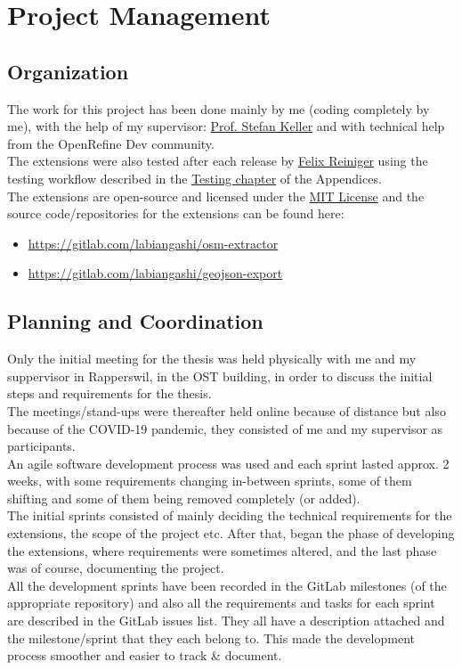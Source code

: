 \chapter{Project Management}
\section{Organization}
The work for this project has been done mainly by me (coding completely by me), with the help of my supervisor: \href{mailto:stefan.keller@ost.ch}{Prof. Stefan Keller}
and with technical help from the OpenRefine Dev community.\\
\newline
The extensions were also tested after each release by \href{mailto:felix.reiniger@ost.ch}{Felix Reiniger} using the testing
workflow described in the \hyperref[sec:test-workflow]{Testing chapter} of the Appendices.\\
\newline
The extensions are open-source and licensed under the \href{https://mit-license.org/}{MIT License} and the
source code/repositories for the extensions can be found here:
\begin{itemize}
    \item \href{https://gitlab.com/labiangashi/osm-extractor}{https://gitlab.com/labiangashi/osm-extractor}
    \item \href{https://gitlab.com/labiangashi/geojson-export}{https://gitlab.com/labiangashi/geojson-export}
\end{itemize}
\pagebreak
\section{Planning and Coordination}
Only the initial meeting for the thesis was held physically with me and my suppervisor in Rapperswil,
in the OST building, in order to discuss the initial steps and requirements for the thesis.\\
\newline
The meetings/stand-ups were thereafter held online because of distance but also because of the COVID-19 pandemic, they consisted of me and my supervisor as participants.\\
An agile software development process was used and each sprint lasted approx. 2 weeks, with some requirements changing in-between sprints,
some of them shifting and some of them being removed completely (or added). \\
\newline
The initial sprints consisted of mainly deciding the technical requirements for the extensions, the scope of the project etc.
After that, began the phase of developing the extensions, where requirements were sometimes altered, and the last phase was of course, documenting the project.\\
\newline
All the development sprints have been recorded in the GitLab milestones (of the appropriate repository) and also all the
requirements and tasks for each sprint are described in the GitLab issues list. They all have a description attached and the
milestone/sprint that they each belong to. This made the development process smoother and easier to track \& document.
\pagebreak

